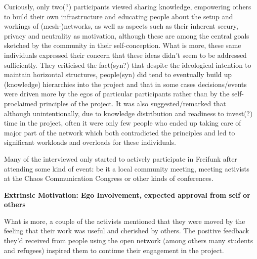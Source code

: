 Curiously, only two(?) participants viewed sharing knowledge, empowering others to build their own infrastructure and educating people about the setup and workings of (mesh-)networks, as well as aspects such as their inherent secury, privacy and neutrality as motivation, although these are among the central goals sketched by the community in their self-conception\cite{ffweb}.
What is more, these same individuals expressed their concern that these ideas didn't seem to be addressed sufficiently.
They criticised the fact(syn?) that despite the ideological intention to maintain horizontal structures, people(syn) did tend to eventually build up (knowledge) hierarchies into the project and that in some cases decisions/events were driven more by the egos of particular participants rather than by the self-proclaimed principles of the project.
It was also suggested/remarked that although unintentionally, due to knowledge distribution and readiness to invest(?) time in the project, often it were only few people who ended up taking care of major part of the network which both contradicted the principles and led to significant workloads and overloads for these individuals.

Many of the interviewed only started to actively participate in Freifunk after attending some kind of event: be it a local community meeting, meeting activists at the Chaos Communication Congress or other kinds of conferences.


\textbf{Extrinsic Motivation: Ego Involvement, expected approval from self or others}

What is more, a couple of the activists mentioned that they were moved by the feeling that their work was useful and cherished by others.
The positive feedback they'd received from people using the open network (among others many students and refugees) inspired them to continue their engagement in the project.


